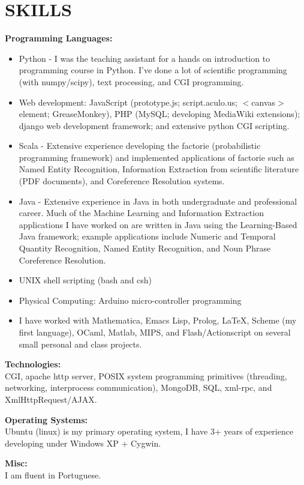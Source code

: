 \documentclass{report}
\begin{document}
\section*{SKILLS} 
{\bf Programming Languages:}
\begin{itemize}
\item Python - I was the teaching assistant for a hands on introduction to programming course in Python. I've done a lot of scientific programming (with numpy/scipy), text processing, and CGI programming.
\item Web development: JavaScript (prototype.js; script.aculo.us; $<$canvas$>$ element; GreaseMonkey), PHP (MySQL; developing MediaWiki extensions); django web development framework; and extensive python CGI scripting.
\item Scala - Extensive experience developing the factorie (probabilistic programming framework) and implemented applications of factorie such as Named Entity Recognition, Information Extraction from scientific literature (PDF documents), and Coreference Resolution systems.
\item Java - Extensive experience in Java in both undergraduate and professional career. Much of the Machine Learning and Information Extraction applications I have worked on are written in Java using the Learning-Based Java framework; example applications include Numeric and Temporal Quantity Recognition, Named Entity Recognition, and Noun Phrase Coreference Resolution.
\item UNIX shell scripting (bash and csh)
\item Physical Computing: Arduino micro-controller programming
\item I have worked with Mathematica, Emacs Lisp, Prolog, \LaTeX, Scheme (my first language), OCaml, Matlab, MIPS, and Flash/Actionscript on several small personal and class projects.
\end{itemize}

{\bf Technologies:} \\
CGI, apache http server, POSIX system programming primitives (threading, networking, interprocess communication), MongoDB, SQL, xml-rpc, and XmlHttpRequest/AJAX. \\ \vspace{-18pt}
   
{\bf Operating Systems:} \\ 
Ubuntu (linux) is my primary operating system, I have 3+ years of experience developing under Windows XP + Cygwin. \\ 

\vspace{-18pt}

{\bf Misc:} \\ 
I am fluent in Portuguese. 

\end{document}
